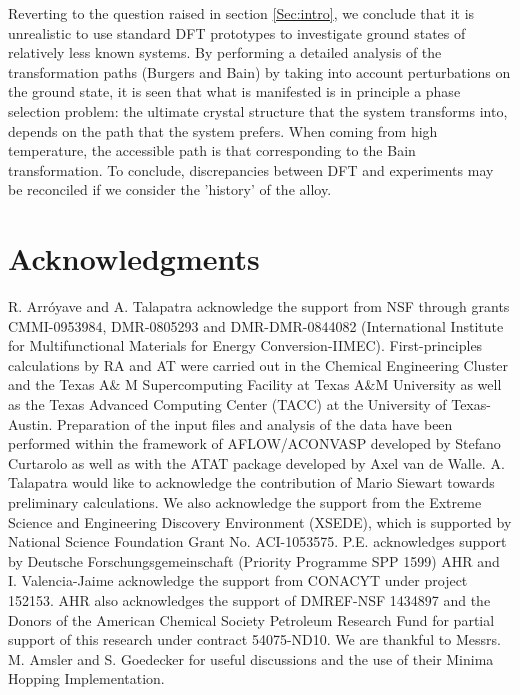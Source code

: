 \documentclass[%
preprint,
 amsmath,amssymb,
 aps,
prb,
showkeys,
]{revtex4-1}
\begin{document}
Reverting to the question raised in section \ref{Sec:intro},  we conclude that  it is  unrealistic to use standard DFT prototypes to investigate ground states of relatively  less known systems. By performing a detailed analysis of the transformation paths (Burgers and Bain) by taking into account perturbations on the ground state, it is seen that what is manifested is in principle a phase selection problem: the ultimate crystal structure that the system transforms into, depends on the path that the system prefers. When coming from high temperature, the accessible path is that corresponding to  the Bain transformation. To conclude, discrepancies between DFT and experiments may be reconciled if we consider the  'history' of the alloy.
\section*{Acknowledgments}
R. Arr\'{o}yave and A. Talapatra acknowledge the support from NSF through grants CMMI-0953984, DMR-0805293 and DMR-DMR-0844082 (International Institute for Multifunctional Materials for Energy Conversion-IIMEC). First-principles calculations by RA and AT were carried out in the Chemical Engineering Cluster and the Texas A\& M Supercomputing Facility at Texas A\&M University as well as the Texas Advanced Computing Center (TACC) at the University of Texas-Austin. Preparation of the input files and analysis of the data have been performed within the framework  of AFLOW/ACONVASP developed by Stefano Curtarolo as well as with the ATAT package developed by Axel van de Walle. A. Talapatra would like to acknowledge the contribution of  Mario Siewart towards preliminary calculations.
We also acknowledge the support from the Extreme Science and Engineering Discovery Environment (XSEDE), which is supported by National Science Foundation Grant No. ACI-1053575. P.E. acknowledges support by Deutsche Forschungsgemeinschaft (Priority Programme SPP 1599) AHR and I. Valencia-Jaime acknowledge the support from CONACYT under project 152153. AHR also acknowledges the support of DMREF-NSF 1434897 and the Donors of the American Chemical Society Petroleum Research Fund for partial support of this research under contract 54075-ND10. We are thankful to Messrs. M. Amsler and S. Goedecker for useful discussions and the use of  their Minima Hopping Implementation.	

\end{document}
